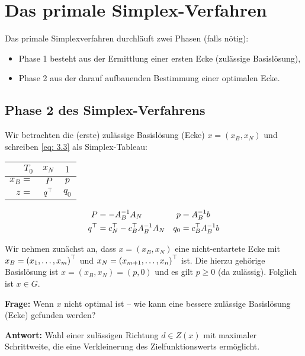 \section{Das primale Simplex-Verfahren}

Das primale Simplexverfahren durchläuft zwei Phasen (falls nötig):
\begin{itemize}
	\item Phase 1 besteht aus der Ermittlung einer ersten Ecke (zulässige Basislösung), 
	\item Phase 2 aus der darauf aufbauenden Bestimmung einer optimalen Ecke.
\end{itemize} 

\subsection{Phase 2 des Simplex-Verfahrens}

Wir betrachten die (erste) zulässige Basislösung (Ecke) $x = (x_B, x_N)$ und schreiben \eqref{eq: 3.3} als Simplex-Tableau:

\begin{center}
	\begin{tabular}{r|c|c}
		$T_0$ & $x_N$ & $1$ \\ \hline
		$x_B = $ & $P$ & $p$ \\ \hline
		$z =$ & $q^{\top}$ & $q_0$
	\end{tabular}
\end{center}

\begin{equation}
	\begin{aligned}
		P &= -A_B^{-1} A_N  &
		p &= A_B^{-1} b \\
		q^{\top} &= c_N^{\top} - c_B^{\top} A_B^{-1} A_N &
		q_0 &= c_B^{\top} A_B^{-1} b 
	\end{aligned}
	\label{eq: 3.5}	
\end{equation}


Wir nehmen zunächst an, dass $x = (x_B, x_N)$ eine nicht-entartete Ecke mit $x_B = \left( x_1, \dots, x_m \right)^{\top}$ und $x_N = \left( x_{m+1}, \dots, x_n \right)^{\top}$ ist. Die hierzu gehörige Basislösung ist $x = (x_B, x_N) = (p,0)$ und es gilt $p \ge 0$ (da zulässig). Folglich ist $x \in G$.

\textbf{Frage:} Wenn $x$ nicht optimal ist -- wie kann eine bessere zulässige Basislösung (Ecke) gefunden werden?

\textbf{Antwort:} Wahl einer zulässigen Richtung $d \in Z(x)$ mit maximaler Schrittweite, die eine Verkleinerung des Zielfunktionswerts ermöglicht.

